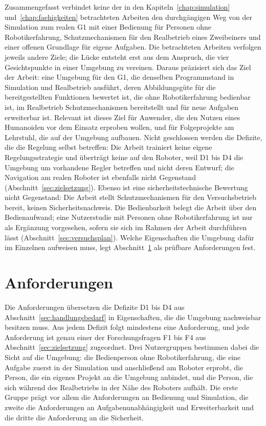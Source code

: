 Zusammengefasst verbindet keine der in den Kapiteln~\ref{chap:simulation} und~\ref{chap:faehigkeiten} betrachteten Arbeiten den durchgängigen Weg von der Simulation zum realen G1 mit einer Bedienung für Personen ohne Robotikerfahrung, Schutzmechanismen für den Realbetrieb eines Zweibeiners und einer offenen Grundlage für eigene Aufgaben.
Die betrachteten Arbeiten verfolgen jeweils andere Ziele; die Lücke entsteht erst aus dem Anspruch, die vier Gesichtspunkte in einer Umgebung zu vereinen.
Daraus präzisiert sich das Ziel der Arbeit: eine Umgebung für den G1, die denselben Programmstand in Simulation und Realbetrieb ausführt, deren Abbildungsgüte für die bereitgestellten Funktionen bewertet ist, die ohne Robotikerfahrung bedienbar ist, im Realbetrieb Schutzmechanismen bereitstellt und für neue Aufgaben erweiterbar ist.
Relevant ist dieses Ziel für Anwender, die den Nutzen eines Humanoiden vor dem Einsatz erproben wollen, und für Folgeprojekte am Lehrstuhl, die auf der Umgebung aufbauen.
Nicht geschlossen werden die Defizite, die die Regelung selbst betreffen: Die Arbeit trainiert keine eigene Regelungsstrategie und überträgt keine auf den Roboter, weil D1 bis D4 die Umgebung um vorhandene Regler betreffen und nicht deren Entwurf; die Navigation am realen Roboter ist ebenfalls nicht Gegenstand (Abschnitt~\ref{sec:zielsetzung}).
Ebenso ist eine sicherheitstechnische Bewertung nicht Gegenstand: Die Arbeit stellt Schutzmechanismen für den Versuchsbetrieb bereit, keinen Sicherheitsnachweis.
Die Bedienbarkeit belegt die Arbeit über den Bedienaufwand; eine Nutzerstudie mit Personen ohne Robotikerfahrung ist nur als Ergänzung vorgesehen, sofern sie sich im Rahmen der Arbeit durchführen lässt (Abschnitt~\ref{sec:versuchsplan}).
Welche Eigenschaften die Umgebung dafür im Einzelnen aufweisen muss, legt Abschnitt~\ref{sec:anforderungen} als prüfbare Anforderungen fest.

\section{Anforderungen}
\label{sec:anforderungen}
Die Anforderungen übersetzen die Defizite D1 bis D4 aus Abschnitt~\ref{sec:handlungsbedarf} in Eigenschaften, die die Umgebung nachweisbar besitzen muss.
Aus jedem Defizit folgt mindestens eine Anforderung, und jede Anforderung ist genau einer der Forschungsfragen F1 bis F4 aus Abschnitt~\ref{sec:zielsetzung} zugeordnet.
Drei Nutzergruppen bestimmen dabei die Sicht auf die Umgebung: die Bedienperson ohne Robotikerfahrung, die eine Aufgabe zuerst in der Simulation und anschließend am Roboter erprobt, die Person, die ein eigenes Projekt an die Umgebung anbindet, und die Person, die sich während des Realbetriebs in der Nähe des Roboters aufhält.
Die erste Gruppe prägt vor allem die Anforderungen an Bedienung und Simulation, die zweite die Anforderungen an Aufgabenunabhängigkeit und Erweiterbarkeit und die dritte die Anforderung an die Sicherheit.

